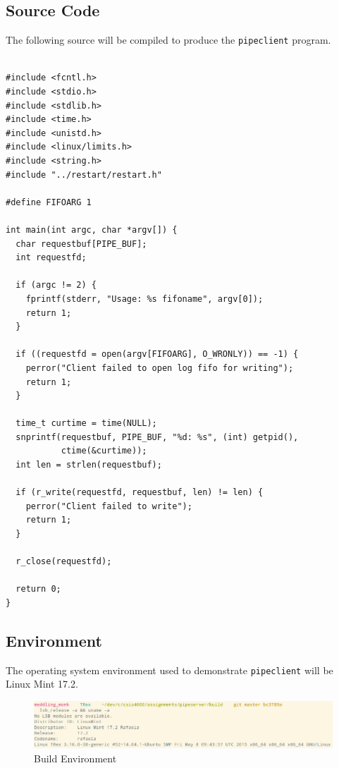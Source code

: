 \documentclass[letter,12pt,sffamily]{article}
\begin{document}
\subsection{Source Code}
The following source will be compiled to produce the \texttt{pipeclient} program.
\renewcommand{\theFancyVerbLine}{
	\sffamily\textcolor[rgb]{0.5,0.5,0.5}{\scriptsize\arabic{FancyVerbLine}}}

\begin{verbatim}
	
#include <fcntl.h>
#include <stdio.h>
#include <stdlib.h>
#include <time.h>
#include <unistd.h>
#include <linux/limits.h>
#include <string.h>
#include "../restart/restart.h"

#define FIFOARG 1

int main(int argc, char *argv[]) {
  char requestbuf[PIPE_BUF];
  int requestfd;
	
  if (argc != 2) {
    fprintf(stderr, "Usage: %s fifoname", argv[0]);
    return 1;
  }
	
  if ((requestfd = open(argv[FIFOARG], O_WRONLY)) == -1) {
    perror("Client failed to open log fifo for writing");
    return 1;
  }
	
  time_t curtime = time(NULL);
  snprintf(requestbuf, PIPE_BUF, "%d: %s", (int) getpid(), 
           ctime(&curtime));
  int len = strlen(requestbuf);
	
  if (r_write(requestfd, requestbuf, len) != len) {
    perror("Client failed to write");
    return 1;
  }
	
  r_close(requestfd);
	
  return 0;
}
\end{verbatim}
\subsection{Environment}
The operating system environment used to demonstrate \texttt{pipeclient} will be Linux Mint 17.2.
\begin{figure}[H]
	\centering
	\includegraphics[width=1\linewidth]{./images/0}
	\caption[env]{Build Environment}
	\label{fig:13}
\end{figure}
\end{document}
